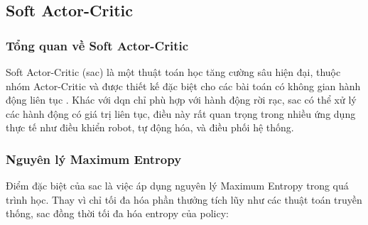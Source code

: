     


\subsection{Soft Actor-Critic}
\subsubsection{Tổng quan về Soft Actor-Critic}
Soft Actor-Critic (\ac{sac}) là một thuật toán học tăng cường sâu hiện đại, thuộc nhóm Actor-Critic và được thiết kế đặc biệt cho các bài toán có không gian hành động liên tục \cite{Haarnoja2018}. Khác với \ac{dqn} chỉ phù hợp với hành động rời rạc, \ac{sac} có thể xử lý các hành động có giá trị liên tục, điều này rất quan trọng trong nhiều ứng dụng thực tế như điều khiển robot, tự động hóa, và điều phối hệ thống.

\subsubsection{Nguyên lý Maximum Entropy}
Điểm đặc biệt của \ac{sac} là việc áp dụng nguyên lý Maximum Entropy trong quá trình học. Thay vì chỉ tối đa hóa phần thưởng tích lũy như các thuật toán truyền thống, \ac{sac} đồng thời tối đa hóa entropy của policy:

